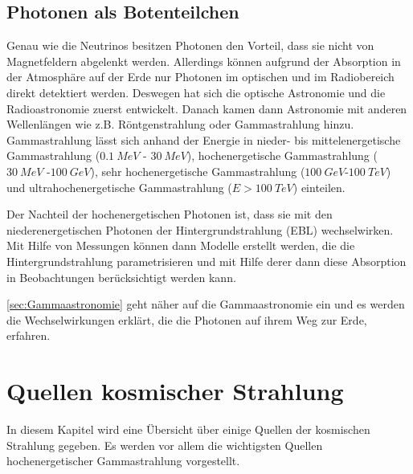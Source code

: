 \subsection{Photonen als Botenteilchen}
\label{subsec:Photonen}
Genau wie die Neutrinos besitzen Photonen den Vorteil, dass sie nicht von Magnetfeldern abgelenkt werden.
Allerdings können aufgrund der Absorption in der Atmosphäre auf der Erde nur Photonen im optischen und im Radiobereich direkt detektiert werden.
Deswegen hat sich die optische Astronomie und die Radioastronomie zuerst entwickelt. 
Danach kamen dann Astronomie mit anderen Wellenlängen wie z.B. Röntgenstrahlung oder Gammastrahlung hinzu.
Gammastrahlung lässt sich anhand der Energie in nieder- bis mittelenergetische Gammastrahlung ($\SI{0,1}{MeV}$ - $\SI{30}{MeV}$), hochenergetische Gammastrahlung ($\SI{30}{MeV}$ -$\SI{100}{GeV}$), sehr hochenergetische Gammastrahlung ($\SI{100}{GeV}$-$\SI{100}{TeV}$) und ultrahochenergetische Gammastrahlung ($E>\SI{100}{TeV}$) einteilen.


Der Nachteil der hochenergetischen Photonen ist, dass sie mit den niederenergetischen Photonen der Hintergrundstrahlung (EBL) wechselwirken.
Mit Hilfe von Messungen können dann Modelle erstellt werden, die die Hintergrundstrahlung parametrisieren und mit Hilfe derer dann diese Absorption in Beobachtungen berücksichtigt werden kann.


\autoref{sec:Gammaastronomie} geht näher auf die Gammaastronomie ein und es werden die Wechselwirkungen erklärt, die die Photonen auf ihrem Weg zur Erde, erfahren.


\section{Quellen kosmischer Strahlung}
\label{sec:Quellen}
In diesem Kapitel wird eine Übersicht über einige Quellen der kosmischen Strahlung gegeben.
Es werden vor allem die wichtigsten Quellen hochenergetischer Gammastrahlung vorgestellt.

